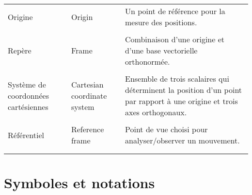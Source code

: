 \begin{center}
\begin{tabular}{  p{3.5cm} p{3.5cm} p{7cm} }
		Origine &  Origin &
		Un point de référence pour la mesure des positions.
		\\  &  \\
		Repère &  Frame &
		Combinaison d'une origine et d'une base vectorielle orthonormée.
		\\  &  \\
		Système de coordonnées cartésiennes & Cartesian coordinate system &
		Ensemble de trois scalaires qui déterminent la position d'un point par rapport à une origine et trois axes orthogonaux. %
		\\   &  \\
		Référentiel & Reference frame &
		Point de vue choisi pour analyser/observer un mouvement.
		\\  &  \\
		\hline
		\label{tab}
	\end{tabular}
\end{center}

\section{Symboles et notations}

